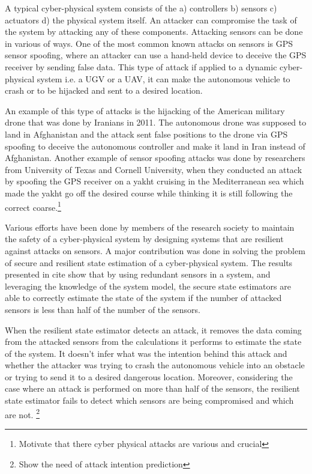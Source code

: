 \documentclass[conference]{IEEEtran}
\begin{document}
A typical cyber-physical system consists of the a) controllers b) sensors c) actuators d) the physical system itself. An attacker can compromise the task of the system by attacking any of these components. Attacking sensors can be done in various of ways. One of the most common known attacks on sensors is GPS sensor spoofing, where an attacker can use a hand-held device to deceive the GPS receiver by sending false data. This type of attack if applied to a dynamic cyber-physical system i.e. a UGV or a UAV, it can make the autonomous vehicle to crash or to be hijacked and sent to a desired location.

An example of this type of attacks is the hijacking of the American military drone that was done by Iranians in 2011. The autonomous drone was supposed to land in Afghanistan and the attack sent false positions to the drone via GPS spoofing to deceive the autonomous controller and make it land in Iran instead of Afghanistan. Another example of sensor spoofing attacks was done by researchers from University of Texas and Cornell University, when they conducted an attack by spoofing the GPS receiver on a yakht cruising in the Mediterranean sea which made the yakht go off the desired course while thinking it is still following the correct coarse.\footnote{Motivate that there cyber physical attacks are various and crucial}

Various efforts have been done by members of the research society to maintain the safety of a cyber-physical system by designing systems that are resilient against attacks on sensors. A major contribution was done in solving the problem of secure and resilient state estimation of a cyber-physical system. The results presented in cite show that by using redundant sensors in a system, and leveraging the knowledge of the system model, the secure state estimators are able to correctly estimate the state of the system if the number of attacked sensors is less than half of the number of the sensors.

When the resilient state estimator detects an attack, it removes the data coming from the attacked sensors from the calculations it performs to estimate the state of the system. It doesn't infer what was the intention behind this attack and whether the attacker was trying to crash the autonomous vehicle into an obstacle or trying to send it to a desired dangerous location. Moreover, considering the case where an attack is performed on more than half of the sensors, the resilient state estimator fails to detect which sensors are being compromised and which are not. \footnote{Show the need of attack intention prediction}
\end{document}
